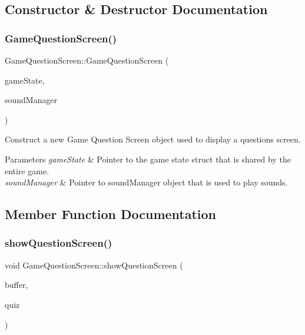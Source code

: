 \subsection{Constructor \& Destructor Documentation}
\mbox{\label{class_game_question_screen_a85740c09f0dd41c8fdece027059e6974}} 
\subsubsection{\texorpdfstring{GameQuestionScreen()}{GameQuestionScreen()}}
{\footnotesize\ttfamily Game\+Question\+Screen\+::\+Game\+Question\+Screen (\begin{DoxyParamCaption}\item[{\mbox{\hyperlink{struct_game_state}{Game\+State}} $\ast$}]{game\+State,  }\item[{\mbox{\hyperlink{class_sound_manager}{Sound\+Manager}} $\ast$}]{sound\+Manager }\end{DoxyParamCaption})}



Construct a new Game Question Screen object used to display a questions screen. 


\begin{DoxyParams}{Parameters}
{\em game\+State} & Pointer to the game state struct that is shared by the entire game. \\
\hline
{\em sound\+Manager} & Pointer to sound\+Manager object that is used to play sounds. \\
\hline
\end{DoxyParams}


\subsection{Member Function Documentation}
\mbox{\label{class_game_question_screen_a78a1bda4b73ba96ea09d04ddd378e60d}} 
\subsubsection{\texorpdfstring{showQuestionScreen()}{showQuestionScreen()}}
{\footnotesize\ttfamily void Game\+Question\+Screen\+::show\+Question\+Screen (\begin{DoxyParamCaption}\item[{B\+I\+T\+M\+AP $\ast$}]{buffer,  }\item[{\mbox{\hyperlink{class_quiz}{Quiz}} $\ast$}]{quiz }\end{DoxyParamCaption})}



